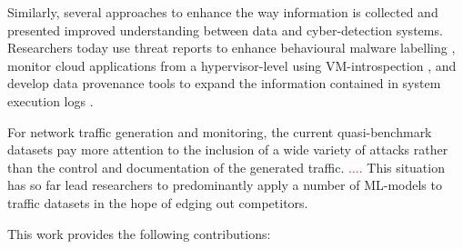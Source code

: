 \documentclass[runningheads]{llncs}
\begin{document}
Similarly, several approaches to enhance the way information is collected and presented improved understanding between data and cyber-detection systems. Researchers today use threat reports to enhance behavioural malware labelling \cite{smith2020mind}, monitor cloud applications from a hypervisor-level using VM-introspection \cite{dolan2011virtuoso}, and develop data provenance tools to expand the information contained in system execution logs \cite{barre2019mining}. 

For network traffic generation and monitoring, the current quasi-benchmark datasets pay more attention to the inclusion of a wide variety of attacks rather than the control and documentation of the generated traffic. \textcolor{red}{....} This situation has so far lead researchers to predominantly apply a number of ML-models to traffic datasets in the hope of edging out competitors.%


 
This work provides the following contributions:
\end{document}
